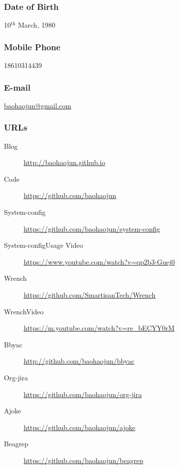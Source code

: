 \documentclass[11pt,dvipdfmx,CJKbookmarks]{article}
\begin{document}
\begin{CJK*}{UTF8}{simsun}
\subsubsection{Date of Birth}
\label{sec-5-0-1}
10$^{\text{th}}$ March, 1980
\subsubsection{Mobile Phone}
\label{sec-5-0-2}
18610314439
\subsubsection{E-mail}
\label{sec-5-0-3}
\href{mailto:baohaojun@gmail.com}{baohaojun@gmail.com}
\subsubsection{URLs}
\label{sec-5-0-4}
\begin{description}
\item[{Blog}] \url{http://baohaojun.github.io}
\item[{Code}] \url{https://github.com/baohaojun}
\item[{System-config}] \url{https://github.com/baohaojun/system-config}
\item[{System-config\thinspace Usage Video}] \url{https://www.youtube.com/watch?v=qp2b3-Guej0}
\item[{Wrench}] \url{https://github.com/SmartisanTech/Wrench}
\item[{Wrench\thinspace Video}] \url{https://m.youtube.com/watch?v=re_bECYY0rM}
\item[{Bbyac}] \url{http://github.com/baohaojun/bbyac}
\item[{Org-jira}] \url{https://github.com/baohaojun/org-jira}
\item[{Ajoke}] \url{https://github.com/baohaojun/ajoke}
\item[{Beagrep}] \url{https://github.com/baohaojun/beagrep}
\end{description}



\end{CJK*}
\end{document}
